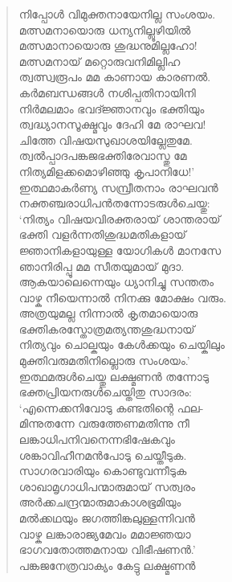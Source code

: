 \begin{verse}
നിപ്പോള്‍ വിമുക്തനായേനില്ല സംശയം.\\
മത്സമനായൊരു ധന്യനില്ലൂഴിയില്‍\\
മത്സമാനായൊരു ശുദ്ധനുമില്ലഹോ!\\
മത്സമനായ് മറ്റൊരുവനിമില്ലിഹ\\
ത്വത്സ്വരൂപം മമ കാണായ കാരണല്‍.\\
കര്‍മബന്ധങ്ങള്‍ നശിപ്പതിനായിനി\\
നിര്‍മലമാം ഭവദ്ജ്ഞാനവും ഭക്തിയും\\
ത്വദ്ധ്യാനസൂക്ഷ്മവും ദേഹി മേ രാഘവ!\\
ചിത്തേ വിഷയസുഖാശയില്ലേതുമേ.\\
ത്വല്‍പ്പാദപങ്കജഭക്തിരേവാസ്തു മേ\\
നിത്യമിളക്കമൊഴിഞ്ഞു കൃപാനിധേ!’\\
ഇത്ഥമാകര്‍ണ്യ സമ്പ്രീതനാം രാഘവന്‍\\
നക്തഞ്ചരാധിപന്‍തന്നോടരുള്‍ചെയ്തു:\\
‘നിത്യം വിഷയവിരക്തരായ് ശാന്തരായ്\\
ഭക്തി വളര്‍ന്നതിശുദ്ധമതികളായ്\\
ജ്ഞാനികളായുള്ള യോഗികള്‍ മാനസേ\\
ഞാനിരിപ്പൂ മമ സീതയുമായ് മുദാ.\\
ആകയാലെന്നെയും ധ്യാനിച്ചു സന്തതം\\
വാഴ്ക നീയെന്നാല്‍ നിനക്കു മോക്ഷം വരും.\\
അത്രയുമല്ല നിന്നാല്‍ കൃതമായൊരു\\
ഭക്തികരസ്തോത്രമത്യന്തശുദ്ധനായ്\\
നിത്യവും ചൊല്കയും കേള്‍ക്കയും ചെയ്കിലും\\
മുക്തിവരുമതിനില്ലൊരു സംശയം.’\\
ഇത്ഥമരുള്‍ചെയ്തു ലക്ഷ്മണന്‍ തന്നോടു\\
ഭക്തപ്രിയനരുള്‍ചെയ്തിതു സാദരം:\\
‘എന്നെക്കനിവോടു കണ്ടതിന്റെ ഫല-\\
മിന്നുതന്നേ വരുത്തേണമതിന്നു നീ\\
ലങ്കാധിപനിവനെന്നഭിഷേകവും\\
ശങ്കാവിഹീനമന്‍പോടു ചെയ്തീടുക.\\
സാഗരവാരിയും കൊണ്ടുവന്നീടുക\\
ശാഖാമൃഗാധിപന്മാരുമായ് സത്വരം\\
അര്‍ക്കചന്ദ്രന്മാരുമാകാശഭൂമിയും\\
മല്‍ക്കഥയും ജഗത്തിങ്കലുള്ളന്നിവന്‍\\
വാഴ്ക ലങ്കാരാജ്യമേവം മമാജ്ഞയാ\\
ഭാഗവതോത്തമനായ വിഭീഷണന്‍.’\\
പങ്കജനേത്രവാക്യം കേട്ടു ലക്ഷ്മണന്‍\\

\end{verse}
